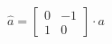 \documentclass[preview]{standalone}
\begin{document}
\begin{align*}
\hat{a} = \begin{bmatrix} 0 & -1 \\ 1 & 0\end{bmatrix} \cdot a
\end{align*}
\end{document}
